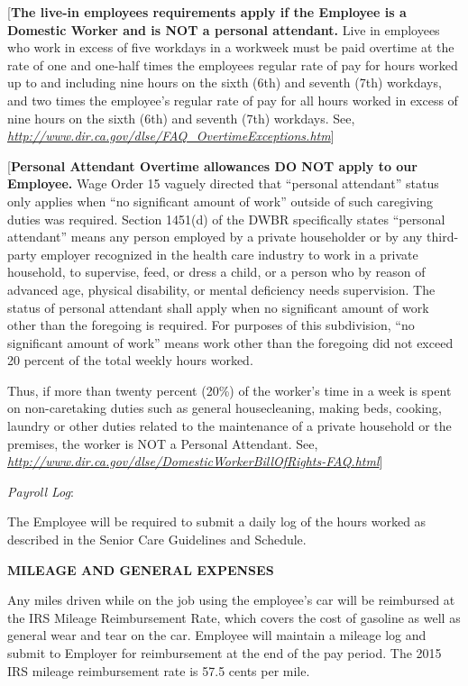\documentclass[]{article}
\begin{document}
{[}\textbf{The live-in employees requirements apply if the Employee is a
Domestic Worker and is NOT a personal attendant.} Live in employees who
work in excess of five workdays in a workweek must be paid overtime at
the rate of one and one-half times the employees regular rate of pay for
hours worked up to and including nine hours on the sixth (6th) and
seventh (7th) workdays, and two times the employee's regular rate of pay
for all hours worked in excess of nine hours on the sixth (6th) and
seventh (7th) workdays. See,
\href{http://www.dir.ca.gov/dlse/FAQ_OvertimeExceptions.htm}{\emph{http://www.dir.ca.gov/dlse/FAQ\_OvertimeExceptions.htm}}{]}

{[}\textbf{Personal Attendant Overtime allowances DO NOT apply to our
Employee.} Wage Order 15 vaguely directed that ``personal attendant''
status only applies when ``no significant amount of work'' outside of
such caregiving duties was required. Section 1451(d) of the DWBR
specifically states ``personal attendant'' means any person employed by
a private householder or by any third-party employer recognized in the
health care industry to work in a private household, to supervise, feed,
or dress a child, or a person who by reason of advanced age, physical
disability, or mental deficiency needs supervision. The status of
personal attendant shall apply when no significant amount of work other
than the foregoing is required. For purposes of this subdivision, ``no
significant amount of work'' means work other than the foregoing did not
exceed 20 percent of the total weekly hours worked.

Thus, if more than twenty percent (20\%) of the worker's time in a week
is spent on non-caretaking duties such as general housecleaning, making
beds, cooking, laundry or other duties related to the maintenance of a
private household or the premises, the worker is NOT a Personal
Attendant. See,
\href{http://www.dir.ca.gov/dlse/DomesticWorkerBillOfRights-FAQ.html}{\emph{http://www.dir.ca.gov/dlse/DomesticWorkerBillOfRights-FAQ.html}}{]}

\emph{Payroll Log}:

The Employee will be required to submit a daily log of the hours worked
as described in the Senior Care Guidelines and Schedule.

\textbf{MILEAGE AND GENERAL EXPENSES}

Any miles driven while on the job using the employee's car will be
reimbursed at the IRS Mileage Reimbursement Rate, which covers the cost
of gasoline as well as general wear and tear on the car. Employee will
maintain a mileage log and submit to Employer for reimbursement at the
end of the pay period. The 2015 IRS mileage reimbursement rate is 57.5
cents per mile.
\end{document}

